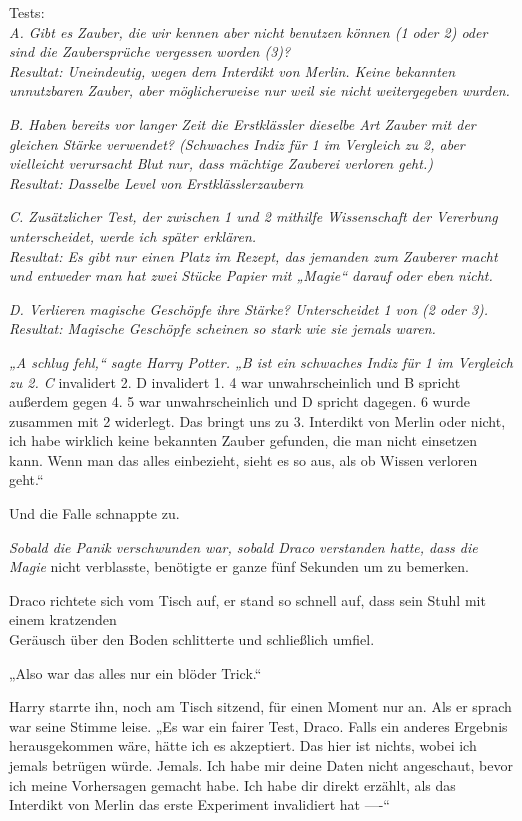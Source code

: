 {Tests:\\ \emph{A. Gibt es Zauber, die wir kennen aber nicht benutzen können (1 oder 2) oder sind die Zaubersprüche vergessen worden (3)?}\\ \emph{Resultat: Uneindeutig, wegen dem Interdikt von Merlin. Keine bekannten unnutzbaren Zauber, aber möglicherweise nur weil sie nicht weitergegeben wurden.}

\emph{B. Haben bereits vor langer Zeit die Erstklässler dieselbe Art Zauber mit der gleichen Stärke verwendet? (Schwaches Indiz für 1 im Vergleich zu 2, aber vielleicht verursacht Blut nur, dass mächtige Zauberei verloren geht.)}\\ \emph{Resultat: Dasselbe Level von Erstklässlerzaubern}

\emph{C. Zusätzlicher Test, der zwischen 1 und 2 mithilfe Wissenschaft der Vererbung unterscheidet, werde ich später erklären.}\\ \emph{Resultat: Es gibt nur einen Platz im Rezept, das jemanden zum Zauberer macht und entweder man hat zwei Stücke Papier mit „Magie“ darauf oder eben nicht.}

\emph{D. Verlieren magische Geschöpfe ihre Stärke? Unterscheidet 1 von (2 oder 3).}\\ \emph{Resultat: Magische Geschöpfe scheinen so stark wie sie jemals waren.}

\emph{„A schlug fehl,“ sagte Harry Potter. „B ist ein schwaches Indiz für 1 im Vergleich zu 2. C} invalidert 2. D invalidert 1. 4 war unwahrscheinlich und B spricht außerdem gegen 4. 5 war unwahrscheinlich und D spricht dagegen. 6 wurde zusammen mit 2 widerlegt. Das bringt uns zu 3. Interdikt von Merlin oder nicht, ich habe wirklich keine bekannten Zauber gefunden, die man nicht einsetzen kann. Wenn man das alles einbezieht, sieht es so aus, als ob Wissen verloren geht.“

Und die Falle schnappte zu.

\emph{Sobald die Panik verschwunden war, sobald Draco verstanden hatte, dass die Magie} nicht verblasste, benötigte er ganze fünf Sekunden um zu bemerken.

Draco richtete sich vom Tisch auf, er stand so schnell auf, dass sein Stuhl mit einem kratzenden\\ Geräusch über den Boden schlitterte und schließlich umfiel.

„Also war das alles nur ein blöder Trick.“

Harry starrte ihn, noch am Tisch sitzend, für einen Moment nur an. Als er sprach war seine Stimme leise. „Es war ein fairer Test, Draco. Falls ein anderes Ergebnis herausgekommen wäre, hätte ich es akzeptiert. Das hier ist nichts, wobei ich jemals betrügen würde. Jemals. Ich habe mir deine Daten nicht angeschaut, bevor ich meine Vorhersagen gemacht habe. Ich habe dir direkt erzählt, als das Interdikt von Merlin das erste Experiment invalidiert hat ----“

}
